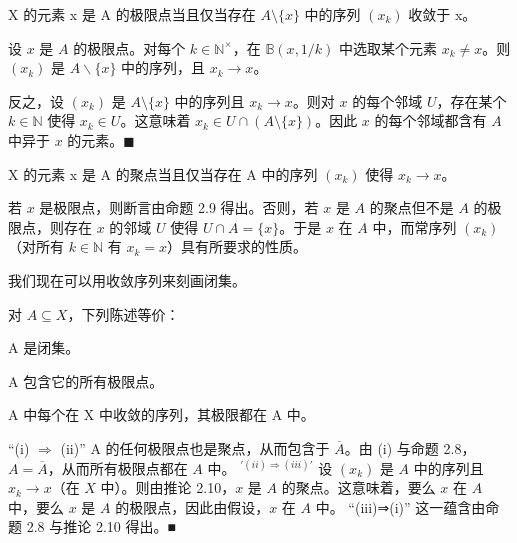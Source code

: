 \begin{proposition}

X 的元素 x 是 A 的极限点当且仅当存在 $ A \setminus \{x\} $ 中的序列 $ (x_k) $ 收敛于 x。

\proofhead
设 $x$ 是 $A$ 的极限点。对每个 $k \in \mathbb{N}^\times$，在 $\mathbb{B}(x, 1/k)$ 中选取某个元素 $x_k \neq x$。则 $(x_k)$ 是 $A\backslash\{x\}$ 中的序列，且 $x_k \to x$。

反之，设 $ (x_k) $ 是 $ A \setminus \{x\} $ 中的序列且 $ x_k \to x $。则对 $ x $ 的每个邻域 $ U $，存在某个 $ k \in \mathbb{N} $ 使得 $ x_k \in U $。这意味着 $ x_k \in U \cap (A \setminus \{x\}) $。因此 $ x $ 的每个邻域都含有 $ A $ 中异于 $ x $ 的元素。$ \blacksquare $
\end{proposition}

\begin{corollary}

X 的元素 x 是 A 的聚点当且仅当存在 A 中的序列 $ (x_k) $ 使得 $ x_k \to x $。

\proofhead
若 $x$ 是极限点，则断言由命题 2.9 得出。否则，若 $x$ 是 $A$ 的聚点但不是 $A$ 的极限点，则存在 $x$ 的邻域 $U$ 使得 $U \cap A = \{x\}$。于是 $x$ 在 $A$ 中，而常序列 $(x_k)$（对所有 $k \in \mathbb{N}$ 有 $x_k = x$）具有所要求的性质。

我们现在可以用收敛序列来刻画闭集。
\end{corollary}

\begin{proposition}

对 $ A \subseteq X $，下列陈述等价：

\begin{subitems}
\item

A 是闭集。

\item

A 包含它的所有极限点。

\item

A 中每个在 X 中收敛的序列，其极限都在 A 中。

\proofhead
“(i) $ \Rightarrow $ (ii)” A 的任何极限点也是聚点，从而包含于 $ \overline{A} $。由 (i) 与命题 2.8，$ A = \overline{A} $，从而所有极限点都在 $ A $ 中。
$ ^{'(ii) \Rightarrow (iii)'} $ 设 $ (x_k) $ 是 $ A $ 中的序列且 $ x_k \to x $（在 $ X $ 中）。则由推论 2.10，$ x $ 是 $ A $ 的聚点。这意味着，要么 $ x $ 在 $ A $ 中，要么 $ x $ 是 $ A $ 的极限点，因此由假设，$ x $ 在 $ A $ 中。
“(iii)⇒(i)” 这一蕴含由命题 2.8 与推论 2.10 得出。■
\end{subitems}

\end{proposition}

